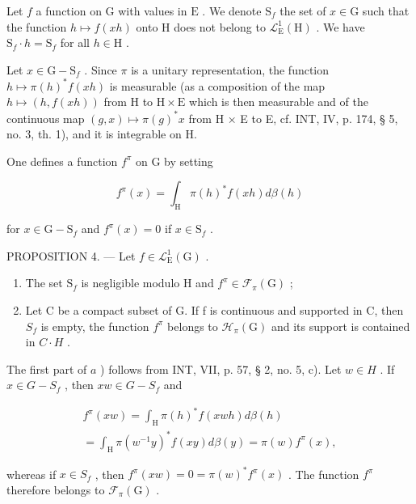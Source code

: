 Let \(f\) a function on \(\mathrm{G}\) with values in \(\mathrm{E}\) . We denote \(\mathrm{S}_{f}\) the set of \(x\in \mathrm{G}\) such that the function \(h\mapsto f(xh)\) onto \(\mathrm{H}\) does not belong to \(\mathcal{L}_{\mathrm{E}}^{1}(\mathrm{H})\) . We have \(\mathrm{S}_f\cdot h = \mathrm{S}_f\) for all \(h\in \mathrm{H}\) .

Let \(x \in \mathrm{G} - \mathrm{S}_f\) . Since \(\pi\) is a unitary representation, the function \(h \mapsto \pi(h)^* f(xh)\) is measurable (as a composition of the map \(h \mapsto (h, f(xh))\) from H to \(\mathrm{H} \times \mathrm{E}\) which is then measurable and of the continuous map \((g,x)\mapsto\pi(g)^{*}x\) from H × E to E, cf. INT, IV, p. 174, § 5, no. 3, th. 1), and it is integrable on H.

One defines a function \(f^{\pi}\) on G by setting

\[
f ^ {\pi} (x) = \int_ {\mathrm{H}} \pi (h) ^ {*} f (x h) d \beta (h)\tag{3}
\]

for \(x \in \mathrm{G} - \mathrm{S}_f\) and \(f^\pi(x) = 0\) if \(x \in \mathrm{S}_f\) .

PROPOSITION 4. --- Let \(f \in \mathcal{L}_{\mathrm{E}}^{1}(\mathrm{G})\) .

\begin{enumerate}
\def\labelenumi{\alph{enumi})}
\item
  The set \(\mathrm{S}_f\) is negligible modulo H and \(f^\pi \in \mathcal{F}_\pi(\mathrm{G})\) ;
\item
  Let C be a compact subset of G. If f is continuous and supported in C, then \(S_{f}\) is empty, the function \(f^{\pi}\) belongs to \(\mathcal{H}_{\pi}(\mathrm{G})\) and its support is contained in \(C \cdot H\) .
\end{enumerate}

The first part of \(a\) ) follows from INT, VII, p. 57, § 2, no. 5, c). Let \(w \in H\) . If \(x \in G - S_f\) , then \(xw \in G - S_f\) and

\[
\begin{array}{c} f ^ {\pi} (x w) = \int_ {\mathrm{H}} \pi (h) ^ {*} f (x w h) d \beta (h) \\ = \int_ {\mathrm{H}} \pi (w ^ {- 1} y) ^ {*} f (x y) d \beta (y) = \pi (w) f ^ {\pi} (x), \end{array}
\]

whereas if \(x \in S_{f}\) , then \(f^{\pi}(xw) = 0 = \pi(w)^{*}f^{\pi}(x)\) . The function \(f^{\pi}\) therefore belongs to \(\mathcal{F}_{\pi}(\mathrm{G})\) .

